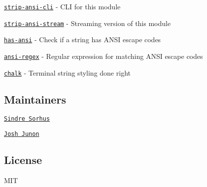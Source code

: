 \begin{DoxyItemize}
\item \href{https://github.com/chalk/strip-ansi-cli}{\tt strip-\/ansi-\/cli} -\/ C\+LI for this module
\item \href{https://github.com/chalk/strip-ansi-stream}{\tt strip-\/ansi-\/stream} -\/ Streaming version of this module
\item \href{https://github.com/chalk/has-ansi}{\tt has-\/ansi} -\/ Check if a string has A\+N\+SI escape codes
\item \href{https://github.com/chalk/ansi-regex}{\tt ansi-\/regex} -\/ Regular expression for matching A\+N\+SI escape codes
\item \href{https://github.com/chalk/chalk}{\tt chalk} -\/ Terminal string styling done right
\end{DoxyItemize}

\subsection*{Maintainers}


\begin{DoxyItemize}
\item \href{https://github.com/sindresorhus}{\tt Sindre Sorhus}
\item \href{https://github.com/qix-}{\tt Josh Junon}
\end{DoxyItemize}

\subsection*{License}

M\+IT 